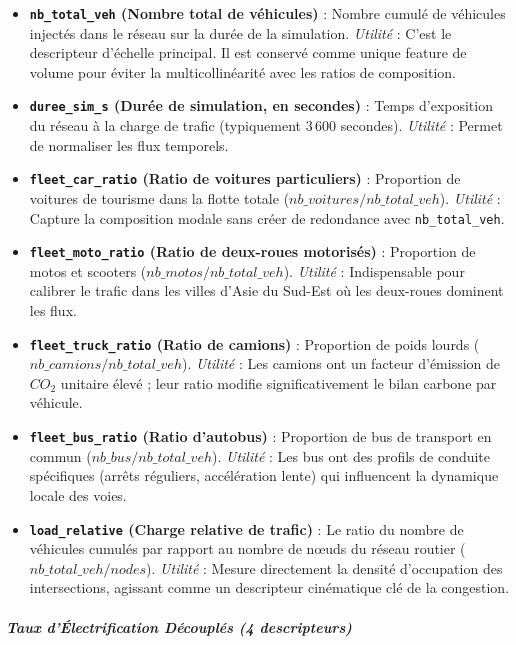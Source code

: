 \documentclass[10pt, a4paper]{article}
\providecommand{\tightlist}{}
\begin{document}
\begin{itemize}
\tightlist
\item
  \textbf{\texttt{nb\_total\_veh} (Nombre total de véhicules)} : Nombre
  cumulé de véhicules injectés dans le réseau sur la durée de la
  simulation. \emph{Utilité} : C'est le descripteur d'échelle principal.
  Il est conservé comme unique feature de volume pour éviter la
  multicollinéarité avec les ratios de composition.
\item
  \textbf{\texttt{duree\_sim\_s} (Durée de simulation, en secondes)} :
  Temps d'exposition du réseau à la charge de trafic (typiquement 3\,600
  secondes). \emph{Utilité} : Permet de normaliser les flux temporels.
\item
  \textbf{\texttt{fleet\_car\_ratio} (Ratio de voitures particuliers)} :
  Proportion de voitures de tourisme dans la flotte totale
  (\(nb\_voitures / nb\_total\_veh\)). \emph{Utilité} : Capture la
  composition modale sans créer de redondance avec
  \texttt{nb\_total\_veh}.
\item
  \textbf{\texttt{fleet\_moto\_ratio} (Ratio de deux-roues motorisés)} :
  Proportion de motos et scooters (\(nb\_motos / nb\_total\_veh\)).
  \emph{Utilité} : Indispensable pour calibrer le trafic dans les villes
  d'Asie du Sud-Est où les deux-roues dominent les flux.
\item
  \textbf{\texttt{fleet\_truck\_ratio} (Ratio de camions)} : Proportion
  de poids lourds (\(nb\_camions / nb\_total\_veh\)). \emph{Utilité} :
  Les camions ont un facteur d'émission de \(CO_2\) unitaire élevé ;
  leur ratio modifie significativement le bilan carbone par véhicule.
\item
  \textbf{\texttt{fleet\_bus\_ratio} (Ratio d'autobus)} : Proportion de
  bus de transport en commun (\(nb\_bus / nb\_total\_veh\)).
  \emph{Utilité} : Les bus ont des profils de conduite spécifiques
  (arrêts réguliers, accélération lente) qui influencent la dynamique
  locale des voies.
\item
  \textbf{\texttt{load\_relative} (Charge relative de trafic)} : Le
  ratio du nombre de véhicules cumulés par rapport au nombre de nœuds du
  réseau routier (\(nb\_total\_veh / nodes\)). \emph{Utilité} : Mesure
  directement la densité d'occupation des intersections, agissant comme
  un descripteur cinématique clé de la congestion.
\end{itemize}

\subparagraph{Taux d'Électrification Découplés (4
descripteurs)}\label{taux-duxe9lectrification-duxe9coupluxe9s-4-descripteurs-1}
\end{document}
